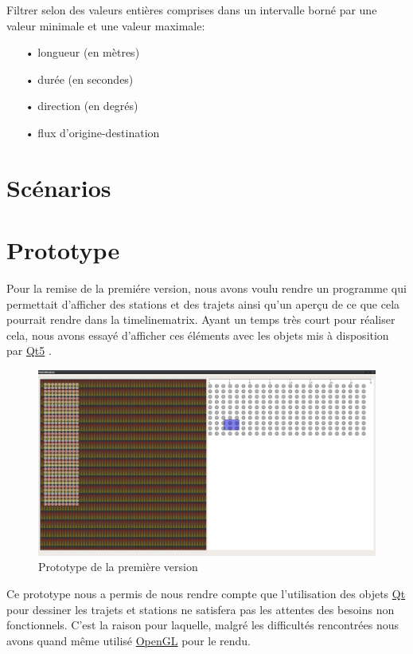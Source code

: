 \documentclass[12pt]{article}
\begin{document}
		Filtrer selon des valeurs entières comprises dans un intervalle borné par une
		valeur minimale et une valeur maximale:
		\begin{itemize}
			\item[•]longueur (en mètres)
			\item[•]durée (en secondes)
			\item[•]direction (en degrés)
			\item[•]flux d’origine-destination
		\end{itemize}
	
	\section{Scénarios}
	
	\section{Prototype}
	Pour la remise de la premiére version, nous avons voulu rendre un programme qui permettait
	d'afficher des stations et des trajets ainsi qu'un aperçu de ce que cela pourrait rendre
	dans la timelinematrix. Ayant un temps très court pour réaliser cela, nous avons essayé
	d'afficher ces éléments avec les objets mis à disposition par \href{https://www.qt.io/}{Qt5}
	.\\
	

	\begin{figure}[!h]
	\begin{center}
	\includegraphics[scale=0.2]{prototype1_screen_shot.png}
	\caption{Prototype de la première version}
	\end{center}
	\end{figure}		
	
	Ce prototype nous a permis de nous rendre compte que l’utilisation des objets
	\href{https://www.qt.io/}{Qt} pour dessiner les trajets et stations
	ne satisfera pas les attentes des besoins non fonctionnels. C’est la raison pour
	laquelle, malgré les difficultés rencontrées nous avons quand même utilisé
	\href{https://www.khronos.org/registry/OpenGL-Refpages/gl4/}{OpenGL}
	pour le rendu.\\
	
\end{document}
